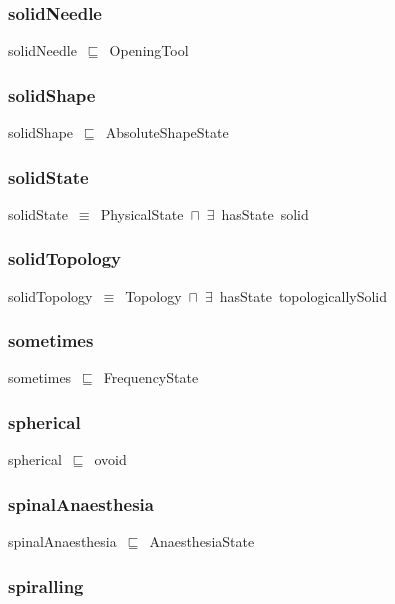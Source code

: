 \documentclass{article}
\begin{document}
\subsubsection*{solidNeedle}

solidNeedle~\ensuremath{\sqsubseteq}~OpeningTool~

\subsubsection*{solidShape}

solidShape~\ensuremath{\sqsubseteq}~AbsoluteShapeState~

\subsubsection*{solidState}

solidState~\ensuremath{\equiv}~PhysicalState~\ensuremath{\sqcap}~\ensuremath{\exists}~hasState~solid

\subsubsection*{solidTopology}

solidTopology~\ensuremath{\equiv}~Topology~\ensuremath{\sqcap}~\ensuremath{\exists}~hasState~topologicallySolid

\subsubsection*{sometimes}

sometimes~\ensuremath{\sqsubseteq}~FrequencyState~

\subsubsection*{spherical}

spherical~\ensuremath{\sqsubseteq}~ovoid~

\subsubsection*{spinalAnaesthesia}

spinalAnaesthesia~\ensuremath{\sqsubseteq}~AnaesthesiaState~

\subsubsection*{spiralling}
\end{document}
